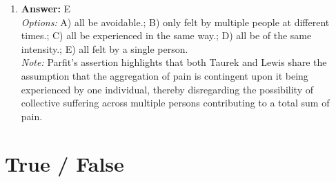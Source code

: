 \documentclass[12pt]{article}
\begin{document}
\begin{enumerate}[label=\arabic*.]
\item \textbf{Answer:} E
\\ \textit{Options:} A) all be avoidable.; B) only felt by multiple people at different times.; C) all be experienced in the same way.; D) all be of the same intensity.; E) all felt by a single person.
\\ \textit{Note:} Parfit's assertion highlights that both Taurek and Lewis share the assumption that the aggregation of pain is contingent upon it being experienced by one individual, thereby disregarding the possibility of collective suffering across multiple persons contributing to a total sum of pain.
\end{enumerate}

\section*{True / False}
\end{document}
